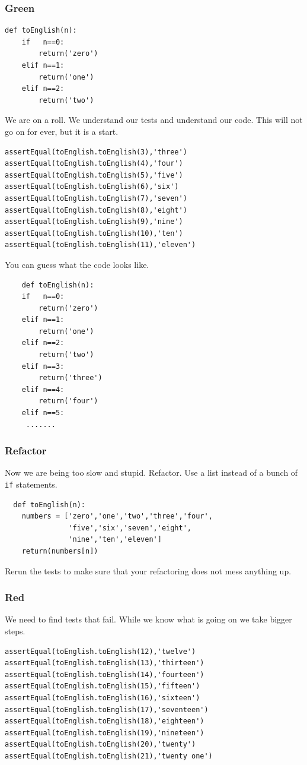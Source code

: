 \documentclass{beamer}
\begin{document}
\begin{frame}[fragile]
\frametitle{Green}
\begin{lstlisting}
def toEnglish(n):
    if   n==0:
        return('zero')
    elif n==1:
        return('one')
    elif n==2:
        return('two')
\end{lstlisting}
\end{frame}
\begin{frame}[fragile]
 We are on a  roll. We understand our tests and understand our
 code. This will not go on for ever, but it is a start.
  \begin{lstlisting}
assertEqual(toEnglish.toEnglish(3),'three')
assertEqual(toEnglish.toEnglish(4),'four')
assertEqual(toEnglish.toEnglish(5),'five')
assertEqual(toEnglish.toEnglish(6),'six')
assertEqual(toEnglish.toEnglish(7),'seven')
assertEqual(toEnglish.toEnglish(8),'eight')
assertEqual(toEnglish.toEnglish(9),'nine')
assertEqual(toEnglish.toEnglish(10),'ten')
assertEqual(toEnglish.toEnglish(11),'eleven')
\end{lstlisting}
\end{frame}
\begin{frame}[fragile]
You can guess what the code looks like.
\begin{lstlisting}
    def toEnglish(n):
    if   n==0:
        return('zero')
    elif n==1:
        return('one')
    elif n==2:
        return('two')
    elif n==3:
        return('three')
    elif n==4:
        return('four')
    elif n==5:
     ....... 
\end{lstlisting}
\end{frame}
\begin{frame}[fragile]
\frametitle{Refactor}
Now we are being too slow and stupid. Refactor. Use a list instead of
a bunch of {\tt if} statements.
\begin{lstlisting}
  def toEnglish(n):
    numbers = ['zero','one','two','three','four',
               'five','six','seven','eight',
               'nine','ten','eleven']
    return(numbers[n])
\end{lstlisting}
Rerun the tests to make sure that your refactoring does not mess
anything up.
\end{frame}
\begin{frame}[fragile]
\frametitle{Red}
We need to find tests that fail. While we know what is going on we
take bigger steps. 
\begin{lstlisting}
assertEqual(toEnglish.toEnglish(12),'twelve')	
assertEqual(toEnglish.toEnglish(13),'thirteen')	
assertEqual(toEnglish.toEnglish(14),'fourteen')
assertEqual(toEnglish.toEnglish(15),'fifteen')
assertEqual(toEnglish.toEnglish(16),'sixteen')
assertEqual(toEnglish.toEnglish(17),'seventeen')
assertEqual(toEnglish.toEnglish(18),'eighteen')
assertEqual(toEnglish.toEnglish(19),'nineteen')
assertEqual(toEnglish.toEnglish(20),'twenty')
assertEqual(toEnglish.toEnglish(21),'twenty one')
\end{lstlisting}
\end{frame}
\end{document}
